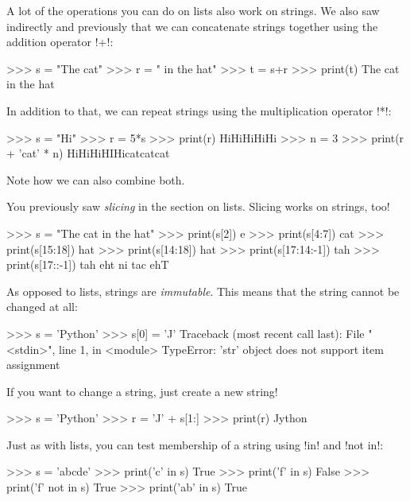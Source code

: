 \documentclass[11pt]{cselabheader}
\begin{document}
A lot of the operations you can do on lists also work on strings. We also saw
indirectly and previously that we can concatenate strings together using the
addition operator \pythoninline!+!:

\begin{pyconcode}
>>> s = "The cat"
>>> r = " in the hat"
>>> t = s+r
>>> print(t)
The cat in the hat
\end{pyconcode}

In addition to that, we can repeat strings using the multiplication operator
\pythoninline!*!:

\begin{pyconcode}
>>> s = "Hi"
>>> r = 5*s
>>> print(r)
HiHiHiHiHi
>>> n = 3
>>> print(r + 'cat' * n)
HiHiHiHIHicatcatcat
\end{pyconcode}

Note how we can also combine both.

You previously saw \emph{slicing} in the section on lists. Slicing works on strings, too!

\begin{pyconcode}
>>> s = "The cat in the hat"
>>> print(s[2])
e
>>> print(s[4:7])
cat
>>> print(s[15:18])
hat
>>> print(s[14:18])
 hat
>>> print(s[17:14:-1])
tah
>>> print(s[17::-1])
tah eht ni tac ehT
\end{pyconcode}

As opposed to lists, strings are \emph{immutable}. This means that the string
cannot be changed at all:

\begin{pyconcode}
>>> s = 'Python'
>>> s[0] = 'J'
Traceback (most recent call last):
  File "<stdin>", line 1, in <module>
TypeError: 'str' object does not support item assignment
\end{pyconcode}

If you want to change a string, just create a new string!

\begin{pyconcode}
>>> s = 'Python'
>>> r = 'J' + s[1:]
>>> print(r)
Jython
\end{pyconcode}

Just as with lists, you can test membership of a string using \pythoninline!in! and
\pythoninline!not in!:

\begin{pyconcode}
>>> s = 'abcde'
>>> print('c' in s)
True
>>> print('f' in s)
False
>>> print('f' not in s)
True
>>> print('ab' in s)
True
\end{pyconcode}
\end{document}

